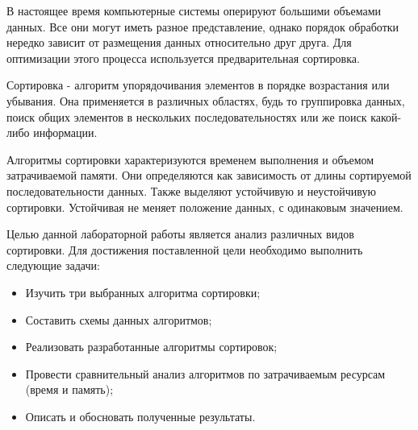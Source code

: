 \setcounter{page}{4}

В настоящее время компьютерные системы оперируют большими объемами данных. Все они могут иметь разное представление, однако порядок обработки нередко зависит от размещения данных относительно друг друга. Для оптимизации этого процесса используется предварительная сортировка.

Сортировка - алгоритм упорядочивания элементов в порядке возрастания или убывания. Она применяется в различных областях, будь то группировка данных, поиск общих элементов в нескольких последовательностях или же поиск какой-либо информации.

Алгоритмы сортировки характеризуются временем выполнения и объемом затрачиваемой памяти. Они определяются как зависимость от длины сортируемой последовательности данных. Также выделяют устойчивую и неустойчивую сортировки. Устойчивая не меняет положение данных, с одинаковым значением.

Целью данной лабораторной работы является анализ различных видов сортировки. Для достижения поставленной цели необходимо выполнить следующие задачи:
\begin{itemize}
	\item Изучить три выбранных алгоритма сортировки;
	\item Составить схемы данных алгоритмов;
	\item Реализовать разработанные алгоритмы сортировок;
	\item Провести сравнительный анализ алгоритмов по затрачиваемым ресурсам (время и память);
	\item Описать и обосновать полученные результаты.
\end{itemize}